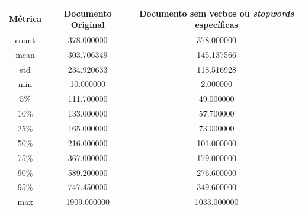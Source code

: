 \begin{center}
    \begin{tabular}{ |c|c|c| }
        \hline
        Métrica & Documento Original & Documento sem verbos ou \textit{stopwords} específicas \\
        \hline
        count & 378.000000 & 378.000000 \\
        \hline
        mean & 303.706349 & 145.137566 \\
        \hline
        std & 234.920633 & 118.516928 \\
        \hline
        min & 10.000000 & 2.000000 \\
        \hline
        5\% & 111.700000 & 49.000000 \\
        \hline
        10\% & 133.000000 & 57.700000 \\
        \hline
        25\% & 165.000000 & 73.000000 \\
        \hline
        50\% & 216.000000 & 101.000000 \\
        \hline
        75\% & 367.000000 & 179.000000 \\
        \hline
        90\% & 589.200000 & 276.600000 \\
        \hline
        95\% & 747.450000 & 349.600000 \\
        \hline
        max & 1909.000000 & 1033.000000 \\       
        \hline
    \end{tabular}
\end{center}